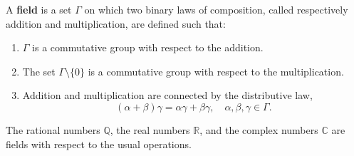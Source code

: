 A \textbf{field} is a set $\Gamma$ on which two binary laws of composition, called respectively addition and multiplication, are defined such that:

\begin{enumerate}
  \item $\Gamma$ is a commutative group with respect to the addition.
  \item The set $\Gamma \setminus \{0\}$ is a commutative group with respect to the multiplication.
  \item Addition and multiplication are connected by the distributive law,
  $$(\alpha + \beta)\gamma = \alpha \gamma + \beta \gamma, \quad \alpha, \beta, \gamma \in \Gamma.$$
\end{enumerate}

The rational numbers $\mathbb{Q}$, the real numbers $\mathbb{R}$, and the complex numbers $\mathbb{C}$ are fields with respect to the usual operations.
